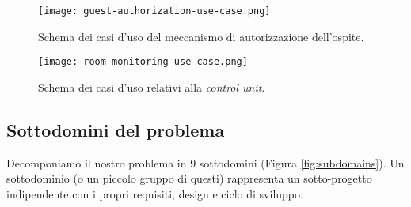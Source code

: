 \begin{figure}[H]
    \texttt{[image: guest-authorization-use-case.png]}
    \centering
    \caption[guest-authorization-usecase]{Schema dei casi d'uso del meccanismo di autorizzazione dell'ospite.}
    \label{fig:guest-authorization-usecase}
\end{figure}

\begin{figure}[H]
    \texttt{[image: room-monitoring-use-case.png]}
    \centering
    \caption[room-monitoring-usecase]{Schema dei casi d'uso relativi alla \textit{control unit}.}
    \label{fig:room-monitoring-usecase}
\end{figure}

\subsection{Sottodomini del problema}
Decomponiamo il nostro problema in 9 sottodomini (Figura \ref*{fig:subdomains}).
Un sottodominio (o un piccolo gruppo di questi) rappresenta un sotto-progetto indipendente con i propri requisiti, design e ciclo di sviluppo.

